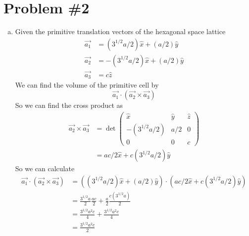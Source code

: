 \documentclass[11pt]{article}
\numberwithin{equation}{section}
\begin{document}
\section{Problem \#2}
\begin{enumerate}[(a)]
\item
Given the primitive translation vectors of the hexagonal space lattice 
\begin{align}
\vec{a_1} &= (3^{1/2}a/2)\hat{x} + (a/2)\hat{y}\\
\vec{a_2} &= -(3^{1/2}a/2)\hat{x} + (a/2)\hat{y}\\
\vec{a_3} &= c\hat{z}
\end{align}
We can find the volume of the primitive cell by
$$\vec{a_1}\cdot(\vec{a_2}\times\vec{a_3})$$
So we can find the cross product as
\begin{align*}
\vec{a_2}\times\vec{a_3} &= \det\left(\begin{array}{ccc}
			\hat{x}		&\hat{y}	&\hat{z}\\
			-(3^{1/2}a/2) 	&a/2		&0\\
			0		&0		&c
				\end{array}\right)\\
&= ac/2\hat{x} + c(3^{1/2}a/2)\hat{y}
\end{align*}
So we can calculate 
\begin{align*}
\vec{a_1}\cdot(\vec{a_2}\times\vec{a_3}) &= ((3^{1/2}a/2)\hat{x} + (a/2)\hat{y})\cdot(ac/2\hat{x} + c(3^{1/2}a/2)\hat{y})\\
&= \frac{3^{1/2}a}{2}\frac{ac}{2} + \frac{a}{2}\frac{c(3^{1/2}a)}{2}\\
&= \frac{3^{1/2}a^2c}{4} + \frac{3^{1/2}a^2c}{4}\\
&= \frac{3^{1/2}a^2c}{2}
\end{align*}


\end{enumerate}
\end{document}
